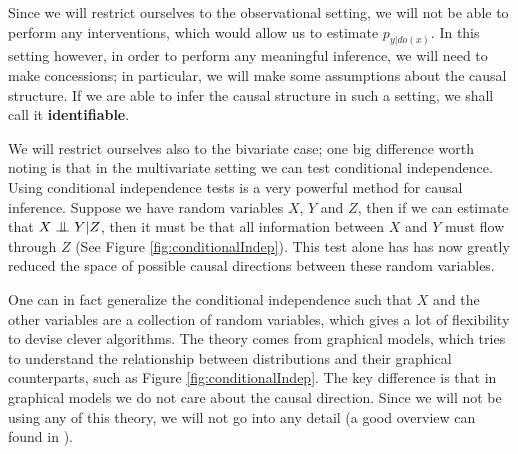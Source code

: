 Since we will restrict ourselves to the observational setting, we will not be able to perform any interventions,
which would allow us to estimate $p_{y|do(x)}$. In this setting however, in order to perform any meaningful
inference, we will need to make concessions; in particular, we will make some assumptions about 
the causal structure. If we are able to infer the causal structure in such a setting, we 
shall call it \textbf{identifiable}.



We will restrict ourselves also to the bivariate case; one big difference worth noting is that in the
multivariate setting we can test conditional independence. Using conditional independence tests 
is a very powerful method for causal inference. Suppose 
we have random variables $X$, $Y$ and $Z$, then if we can estimate that $X \bigCI Y | Z$, then it must be 
that all information between $X$ and $Y$ must flow through $Z$ (See Figure \ref{fig:conditionalIndep}).
This test alone has has now greatly reduced the space of possible causal directions between these random variables.

One can in fact generalize the conditional independence such that $X$ and the other variables are 
a collection of random variables, which gives a lot of flexibility to devise clever algorithms. 
The theory comes from graphical models, which tries to understand the relationship between 
distributions and their graphical counterparts, such as Figure \ref{fig:conditionalIndep}.
The key difference is that in graphical models we do not care about the causal direction. 
Since we will not be using any of this theory, we will not go into any detail 
(a good overview can found in \cite{bishop2006pattern}).

